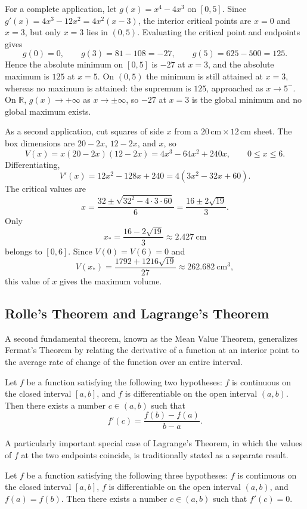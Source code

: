 For a complete application, let $g(x)=x^4-4x^3$ on $[0,5]$. Since $g'(x)=4x^3-12x^2=4x^2(x-3)$, the interior critical points are $x=0$ and $x=3$, but only $x=3$ lies
in $(0,5)$. Evaluating the critical point and endpoints gives
\[
g(0)=0,\qquad g(3)=81-108=-27,\qquad g(5)=625-500=125.
\]
Hence the absolute minimum on $[0,5]$ is $-27$ at $x=3$, and the
absolute maximum is $125$ at $x=5$. On $(0,5)$ the minimum is still
attained at $x=3$, whereas no maximum is attained: the supremum is
$125$, approached as $x\to5^-$. On $\mathbb{R}$, $g(x)\to+\infty$ as
$x\to\pm\infty$, so $-27$ at $x=3$ is the global minimum and no global
maximum exists.

As a second application, cut squares of side $x$ from a
$20\,\mathrm{cm}\times12\,\mathrm{cm}$ sheet. The box dimensions are
$20-2x$, $12-2x$, and $x$, so
\[
V(x)=x(20-2x)(12-2x)=4x^3-64x^2+240x,
\qquad 0\leq x\leq6.
\]
Differentiating,
\[
V'(x)=12x^2-128x+240=4(3x^2-32x+60).
\]
The critical values are
\[
x=\frac{32\pm\sqrt{32^2-4\cdot3\cdot60}}{6}
=\frac{16\pm2\sqrt{19}}{3}.
\]
Only
\[
x_* = \frac{16-2\sqrt{19}}{3}\approx2.427\ \mathrm{cm}
\]
 belongs to $[0,6]$. Since $V(0)=V(6)=0$ and
\[
V(x_*)=\frac{1792+1216\sqrt{19}}{27} \approx262.682\ \mathrm{cm}^3,
\] this value of $x$ gives the maximum volume.

\subsection{Rolle's Theorem and Lagrange's Theorem}

A second fundamental theorem, known as the Mean Value Theorem, generalizes Fermat's Theorem by relating the derivative of a function at an interior point to the average rate of change of the function over an entire interval.

\begin{theorem}
Let $f$ be a function satisfying the following two hypotheses: $f$ is continuous on the closed interval $[a,b]$, and $f$ is differentiable on the open interval $(a,b)$. Then there exists a number $c \in (a,b)$ such that
\[
f'(c) = \frac{f(b) - f(a)}{b - a}.
\]

\end{theorem}

A particularly important special case of Lagrange's Theorem, in which the values of $f$ at the two endpoints coincide, is traditionally stated as a separate result.

\begin{theorem}
Let $f$ be a function satisfying the following three hypotheses: $f$ is continuous on the closed interval $[a,b]$, $f$ is differentiable on the open interval $(a,b)$, and $f(a) = f(b)$. Then there exists a number $c \in (a,b)$ such that $f'(c) = 0$.
\end{theorem}

